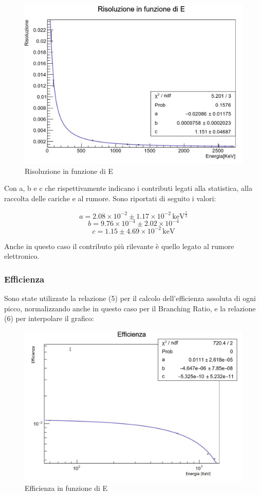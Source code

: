 \documentclass[a4paper,10pt]{article}
\newcommand*{\unit}[1]{\ensuremath{\mathrm{\,#1}}}
\begin{document}
\begin{figure}[H]
    \centering
    \includegraphics[scale=0.45]{grafici/risoluzionemultigamma}
    \caption{Risoluzione in funzione di E}
\end{figure}

\noindent Con a, b e c che rispettivamente indicano i contributi legati alla statistica, alla raccolta delle cariche e al rumore. Sono riportati di seguito i valori:

$$
	a=2.08 \times 10^{-2} \pm 1.17 \times 10^{-2} \unit{keV^{\frac{1}{2}}}
$$
$$
	b=9.76 \times 10^{-4} \pm 2.02 \times 10^{-4}
$$
$$
	c= 1.15 \pm 4.69 \times 10^{-2} \unit{keV}
$$

\noindent Anche in questo caso il contributo pi\`u rilevante \`e quello legato al rumore elettronico.


\subsubsection{Efficienza}
Sono state utilizzate la relazione (5) per il calcolo dell'efficienza assoluta di ogni picco, normalizzando anche in questo caso per il Branching Ratio, e la relazione (6) per interpolare il grafico:

\begin{figure}[H]
    \centering
    \includegraphics[scale=0.45]{grafici/efficienzamultigamma}
    \caption{Efficienza in funzione di E}
\end{figure}
\end{document}
